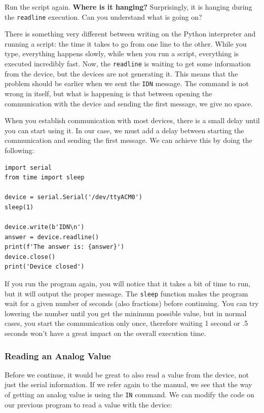 Run the script again. \textbf{Where is it hanging?} Surprisingly, it is hanging during the \texttt{readline} execution. Can you understand what is going on?

There is something very different between writing on the Python interpreter and running a script: the time it takes to go from one line to the other. While you type, everything happens slowly, while when you run a script, everything is executed incredibly fast. Now, the \texttt{readline} is waiting to get some information from the device, but the devices are not generating it. This means that the problem should be earlier when we sent the \texttt{IDN} message. The command is not wrong in itself, but what is happening is that between opening the communication with the device and sending the first message, we give no space. 

When you establish communication with most devices, there is a small delay until you can start using it. In our case, we must add a delay between starting the communication and sending the first message. We can achieve this by doing the following:

\begin{verbatim}
import serial
from time import sleep

device = serial.Serial('/dev/ttyACM0')
sleep(1)

device.write(b'IDN\n')
answer = device.readline()
print(f'The answer is: {answer}')
device.close()
print('Device closed')
\end{verbatim}

If you run the program again, you will notice that it takes a bit of time to run, but it will output the proper message. The \texttt{sleep} function makes the program wait for a given number of seconds (also fractions) before continuing. You can try lowering the number until you get the minimum possible value, but in normal cases, you start the communication only once, therefore waiting 1 second or .5 seconds won't have a great impact on the overall execution time. 

\subsubsection{Reading an Analog Value}
Before we continue, it would be great to also read a value from the device, not just the serial information. If we refer again to the manual, we see that the way of getting an analog value is using the \texttt{IN} command. We can modify the code on our previous program to read a value with the device:

